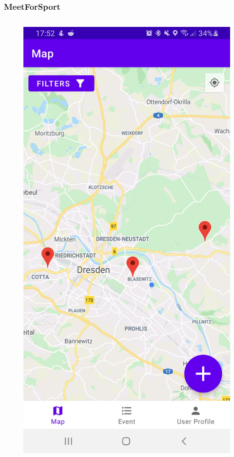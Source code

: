 \documentclass[aspectratio=169]{beamer}
\begin{document}
	\begin{frame}   
		\frametitle{MeetForSport}
		\begin{columns}
			 \begin{figure}
				\centering
				\includegraphics[width=1\textwidth]{media/Map.jpg}

\end{figure}
\end{columns}
\end{frame}
\end{document}
